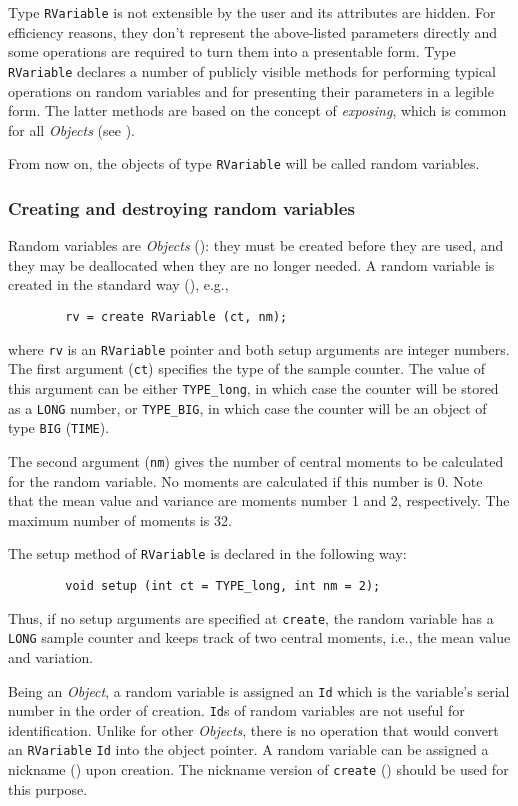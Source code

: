 Type {\tt RVariable} is not extensible by the user and its
attributes are hidden.
For efficiency reasons, they don't represent the above-listed parameters
directly and some operations are required to turn them into a presentable
form.
Type {\tt RVariable} declares a number of publicly visible methods
for performing typical operations on random variables and for presenting
their parameters in a legible form.
The latter methods are based on the concept of {\em exposing}, which is
common for all {\em Objects\/} (see ).

From now on, the objects of type {\tt RVariable} will be called random
variables.

\subsubsection{Creating and destroying random variables}
\label{rm_pm_rv_cr}

Random variables are {\em Objects\/} (): they must be created
before they
are used, and they may be deallocated when they are no longer needed.
A random variable is created in the standard way (), e.g.,
\begin{verbatim}
        rv = create RVariable (ct, nm);
\end{verbatim}
where {\tt rv} is an {\tt RVariable} pointer and both setup
arguments are integer numbers.
The first argument ({\tt ct}) specifies the type of the sample counter.
The value of this argument can be either {\tt TYPE\_long}, in which case
the counter will be stored as a {\tt LONG} number, or {\tt TYPE\_BIG},
in which case the counter will be an object of type {\tt BIG} ({\tt TIME}).

The second argument ({\tt nm}) gives the
number of central moments to be calculated for the random variable.
No moments are calculated if this number is 0.
Note that the mean value and variance are
moments number 1 and 2, respectively.
The maximum number of moments is 32.

The setup method of {\tt RVariable} is declared in the following way:
\begin{verbatim}
        void setup (int ct = TYPE_long, int nm = 2);
\end{verbatim}
Thus, if no setup arguments are specified at {\tt create}, the random
variable has a {\tt LONG} sample counter and keeps track of two
central moments, i.e., the mean value and variation.

Being an {\em Object}, a random variable is assigned an {\tt Id} which
is the variable's serial number in the order of creation.
{\tt Id}s of random variables are not useful for identification.
Unlike for other {\em Objects}, there is no operation that would convert
an {\tt RVariable} {\tt Id} into the object pointer.
A random variable can be assigned a nickname () upon
creation.
The nickname version of {\tt create} () should be used for
this purpose.

